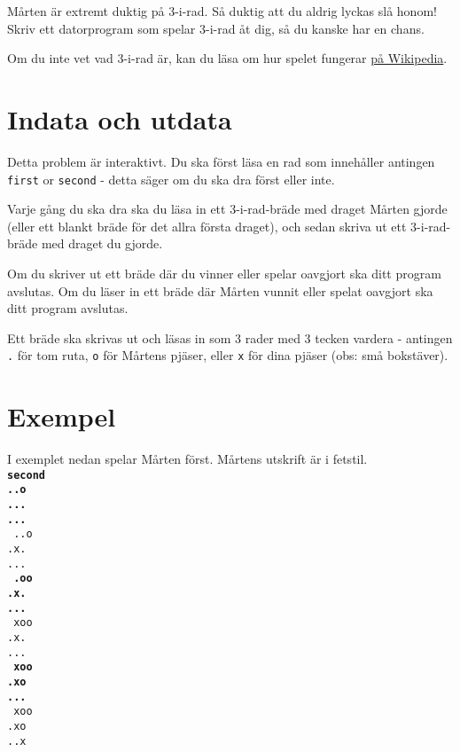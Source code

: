 
Mårten är extremt duktig på 3-i-rad. Så duktig att du aldrig lyckas slå honom! Skriv ett datorprogram som spelar 3-i-rad åt dig, så du kanske har en chans.

Om du inte vet vad 3-i-rad är, kan du läsa om hur spelet fungerar \href{https://sv.wikipedia.org/wiki/Tre_i_rad}{på Wikipedia}.

\section*{Indata och utdata}
Detta problem är interaktivt. Du ska först läsa en rad som innehåller antingen \texttt{first} or \texttt{second} - detta säger om du ska dra först eller inte.

Varje gång du ska dra ska du läsa in ett 3-i-rad-bräde med draget Mårten gjorde
(eller ett blankt bräde för det allra första draget),
och sedan skriva ut ett 3-i-rad-bräde med draget du gjorde.

Om du skriver ut ett bräde där du vinner eller spelar oavgjort ska ditt program avslutas. Om du läser in ett bräde där Mårten vunnit eller spelat oavgjort ska ditt program avslutas.

Ett bräde ska skrivas ut och läsas in som 3 rader med 3 tecken vardera - antingen \texttt{.} för tom ruta, \texttt{o} för Mårtens pjäser, eller \texttt{x} för dina pjäser (obs: små bokstäver).

\section*{Exempel}
I exemplet nedan spelar Mårten först. Mårtens utskrift är i fetstil.\\
\textbf{\texttt{second \\
..o \\
... \\
... \\
}}
\texttt{
..o \\
.x. \\
... \\
}
\textbf{\texttt{
.oo \\
.x. \\
... \\
}}
\texttt{
xoo \\
.x. \\
... \\
}
\textbf{\texttt{
xoo \\
.xo \\
... \\
}}
\texttt{
xoo \\
.xo \\
..x \\
}


